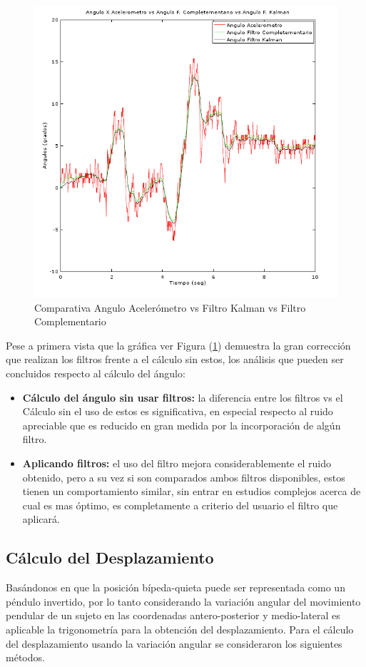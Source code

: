 \documentclass[12pt,a4paper]{article}
\begin{document}
\begin{figure}[H]
	\centering
	\includegraphics[scale=0.75]{images/angKalCom}
	\caption{Comparativa Angulo Acelerómetro vs Filtro Kalman vs Filtro Complementario}
	\label{fig:AnguloXvsFiltros}
\end{figure}

Pese a primera vista que la gráfica ver Figura (\ref{fig:AnguloXvsFiltros}) demuestra la gran corrección que realizan los filtros frente a el cálculo sin estos, los análisis que pueden ser concluidos respecto al cálculo del ángulo:
\begin{itemize}
	\item \textbf{Cálculo del ángulo sin usar filtros:} la diferencia entre los filtros vs el Cálculo sin el uso de estos es significativa, en especial respecto al ruido apreciable que es reducido en gran medida por la incorporación de algún filtro.
	\item \textbf{Aplicando filtros:} el uso del filtro mejora considerablemente el ruido obtenido, pero a su vez si son comparados ambos filtros disponibles, estos tienen un comportamiento similar, sin entrar en estudios complejos acerca de cual es mas óptimo, es completamente a criterio del usuario el filtro que aplicará.
\end{itemize}



\subsection{Cálculo del Desplazamiento}
Basándonos en que la posición bípeda-quieta puede ser representada como un péndulo invertido, por lo tanto considerando la variación angular del movimiento pendular de un sujeto en las coordenadas antero-posterior y medio-lateral es aplicable la trigonometría para la obtención del desplazamiento.
Para el cálculo del desplazamiento usando la variación angular se consideraron los siguientes métodos. 
\end{document}
